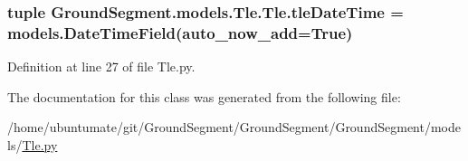 \subsubsection[{tle\+Date\+Time}]{\setlength{\rightskip}{0pt plus 5cm}tuple Ground\+Segment.\+models.\+Tle.\+Tle.\+tle\+Date\+Time = models.\+Date\+Time\+Field(auto\+\_\+now\+\_\+add=True)\hspace{0.3cm}{\ttfamily [static]}}\label{class_ground_segment_1_1models_1_1_tle_1_1_tle_a66ec63c8a5d9f0a43b9aa48993e531a6}


Definition at line 27 of file Tle.\+py.



The documentation for this class was generated from the following file\+:\begin{DoxyCompactItemize}
\item 
/home/ubuntumate/git/\+Ground\+Segment/\+Ground\+Segment/\+Ground\+Segment/models/\hyperlink{_tle_8py}{Tle.\+py}\end{DoxyCompactItemize}
